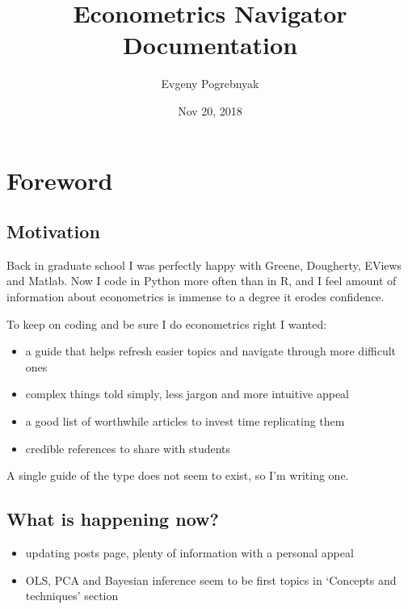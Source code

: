 \documentclass[letterpaper,10pt,english]{sphinxmanual}
\title{Econometrics Navigator Documentation}
\date{Nov 20, 2018}
\author{Evgeny Pogrebnyak}
\begin{document}
\maketitle
\sphinxtableofcontents
{}\label{\detokenize{index::doc}}



\chapter{Foreword}
\label{\detokenize{forward::doc}}\label{\detokenize{forward:welcome-to-econometrics-navigator}}\label{\detokenize{forward:foreword}}

\section{Motivation}
\label{\detokenize{forward:motivation}}
Back in graduate school I was perfectly happy with Greene, Dougherty,
EViews and Matlab. Now I code in Python more often than in R, and I feel
amount of information about econometrics is immense to a degree
it erodes confidence.

To keep on coding and be sure I do econometrics right I wanted:
\begin{itemize}
\item {} 
a guide that helps refresh easier topics and navigate through more difficult ones

\item {} 
complex things told simply, less jargon and more intuitive appeal

\item {} 
a good list of worthwhile articles to invest time replicating them

\item {} 
credible references to share with students

\end{itemize}

A single guide of the type does not seem to exist, so I’m writing one.


\section{What is happening now?}
\label{\detokenize{forward:what-is-happening-now}}
\begin{itemize}
\item {} 
updating  posts page, plenty of information
with a personal appeal

\item {} 
OLS, PCA and Bayesian inference seem to be first topics in
‘Concepts and techniques’ section

\end{itemize}
\end{document}
